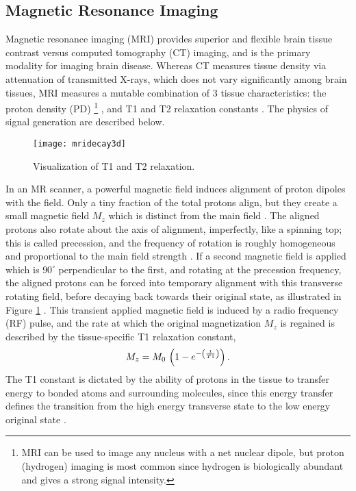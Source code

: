 \subsection{Magnetic Resonance Imaging}\label{ss:mri}
Magnetic resonance imaging (MRI) provides superior and flexible brain tissue contrast versus computed tomography (CT) imaging, and is the primary modality for imaging brain disease.
Whereas CT measures tissue density via attenuation of transmitted X-rays, which does not vary significantly among brain tissues, MRI measures a mutable combination of 3 tissue characteristics: the proton density (PD)%
\footnote{MRI can be used to image any nucleus with a net nuclear dipole, but proton (hydrogen) imaging is most common since hydrogen is biologically abundant and gives a strong signal intensity.}%
, and T1 and T2 relaxation constants \cite{Pooley2005}.
The physics of signal generation are described below.
\par
\begin{figure}[b]
  \centering\texttt{[image: mridecay3d]}
  \caption{Visualization of T1 and T2 relaxation.}
  \label{fig:mridecay3d}
\end{figure}
In an MR scanner, a powerful magnetic field induces alignment of proton dipoles with the field.
Only a tiny fraction of the total protons align, but they create a small magnetic field $M_z$ which is distinct from the main field \cite{Bloch1946}.
The aligned protons also rotate about the axis of alignment, imperfectly, like a spinning top; this is called precession, and the frequency of rotation is roughly homogeneous and proportional to the main field strength \cite{Bloch1946}.
If a second magnetic field is applied which is $90^{\circ}$ perpendicular to the first, and rotating at the precession frequency, the aligned protons can be forced into temporary alignment with this transverse rotating field, before decaying back towards their original state, as illustrated in Figure \ref{fig:mridecay3d} \cite{Bloch1946}.
This transient applied magnetic field is induced by a radio frequency (RF) pulse, and the rate at which the original magnetization $M_z$ is regained is described by the tissue-specific T1 relaxation constant,
\begin{equation}
M_z = M_0\thinspace\left(1-e^{-\left(\frac{t}{T1}\right)}\right)\label{eq:T1}.
\end{equation}
The T1 constant is dictated by the ability of protons in the tissue to transfer energy to bonded atoms and surrounding molecules, since this energy transfer defines the transition from the high energy transverse state to the low energy original state \cite{Bloch1946,Bryant2005}.
